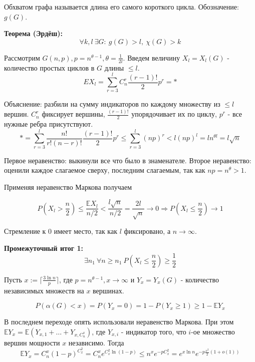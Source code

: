 \par \Def Обхватом графа называется длина его самого короткого цикла. Обозначение: $g(G)$.

\par \textbf{Теорема (Эрдёш):} $$\forall k, l \: \exists G: \: g(G) > l, \: \chi(G) > k$$
\par \Proof Рассмотрим $G(n,p), p = n^{\theta-1}, \theta=\frac{1}{2l}$. Введем величину $X_l=X_l(G)$ - количество простых циклов в $G$ длины $\leq l$.
$$EX_l = \sum_{r=3}^l C_n^r \frac{(r-1)!}{2} p^r=*$$
\par Объяснение: разбили на сумму индикаторов по каждому множеству из $\leq l$ вершин. $C_n^r$ фиксирует вершины, $\frac{(r-1)!}{2}$ упорядочивает их по циклу, $p^r$ - все нужные ребра присутствуют.
$$* =\sum_{r=3}^l \frac{n!}{r!(n-r)!} \frac{(r-1)!}{2} p^r \leq \sum_{r=3}^l (np)^r < l(np)^l=ln^{\theta l}=l\sqrt{n}$$

\par Первое неравенство: выкинули все что было в знаменателе. Второе неравенство: оценили каждое слагаемое сверху, последним слагаемым, так как $np=n^\theta>1$. 

\par Применяя неравенство Маркова получаем

$$P(X_l > \frac{n}{2}) \leq \frac{\mathbb{E}X_l}{n/2}< \frac{l\sqrt{n}}{n/2}=\frac{2l}{\sqrt{n}}\rightarrow 0 \Rightarrow P(X_l \leq \frac{n}{2}) \rightarrow 1$$

\par Стремление к 0 имеет место, так как $l$ фиксировано, а $n\rightarrow\infty$. 
\par \textbf{Промежуточный итог 1:} $$\exists n_1 \: \forall n \geq n_1 \: P(X_l \leq \frac{n}{2}) \geq \frac{1}{2}$$

\par Пусть $x:=\lceil \frac{3\ln{n}}{p} \rceil$, где $p=n^{\theta-1}, x\rightarrow\infty$ и $Y_x=Y_x(G)$ - количество независимых множеств на $x$ вершинах.

$$P(\alpha(G)< x)=P(Y_x=0)=1-P(Y_x \geq 1) \geq 1-\mathbb{E}Y_x$$

\par В последнем переходе опять использовали неравенство Маркова. При этом $\mathbb{E}Y_x=\mathbb{E}(Y_{x,1}+\ldots+Y_{x, C_n^x})$, где $Y_{x, i}$ - индикатор того, что $i$-ое множество вершин мощности $x$ независимо. Тогда $$\mathbb{E}Y_x=C_n^x (1-p)^{C_x^2}=C_n^x e^{C_x^2\ln{(1-p)}}\leq n^x e^{-pC_x^2}=e^{x\ln{n}}e^{-p \frac{x^2}{2}(1+o(1))}$$

